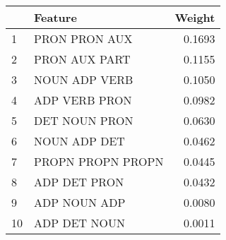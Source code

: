 \begin{tabular}{llr}
\toprule
{} &            Feature &  Weight \\
\midrule
1  &      PRON PRON AUX &  0.1693 \\
2  &      PRON AUX PART &  0.1155 \\
3  &      NOUN ADP VERB &  0.1050 \\
4  &      ADP VERB PRON &  0.0982 \\
5  &      DET NOUN PRON &  0.0630 \\
6  &       NOUN ADP DET &  0.0462 \\
7  &  PROPN PROPN PROPN &  0.0445 \\
8  &       ADP DET PRON &  0.0432 \\
9  &       ADP NOUN ADP &  0.0080 \\
10 &       ADP DET NOUN &  0.0011 \\
\bottomrule
\end{tabular}
